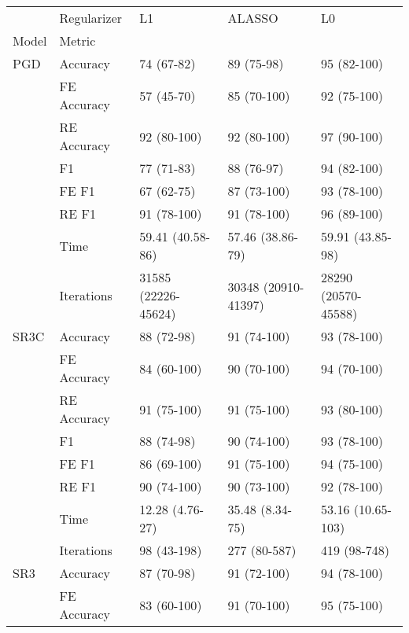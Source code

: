 \begin{tabular}{lllll}
\toprule
    & Regularizer &                   L1 &               ALASSO &                   L0 \\
Model & Metric &                      &                      &                      \\
\midrule
PGD & Accuracy &           74 (67-82) &           89 (75-98) &          95 (82-100) \\
    & FE Accuracy &           57 (45-70) &          85 (70-100) &          92 (75-100) \\
    & RE Accuracy &          92 (80-100) &          92 (80-100) &          97 (90-100) \\
    & F1 &           77 (71-83) &           88 (76-97) &          94 (82-100) \\
    & FE F1 &           67 (62-75) &          87 (73-100) &          93 (78-100) \\
    & RE F1 &          91 (78-100) &          91 (78-100) &          96 (89-100) \\
    & Time &     59.41 (40.58-86) &     57.46 (38.86-79) &     59.91 (43.85-98) \\
    & Iterations &  31585 (22226-45624) &  30348 (20910-41397) &  28290 (20570-45588) \\
SR3C & Accuracy &           88 (72-98) &          91 (74-100) &          93 (78-100) \\
    & FE Accuracy &          84 (60-100) &          90 (70-100) &          94 (70-100) \\
    & RE Accuracy &          91 (75-100) &          91 (75-100) &          93 (80-100) \\
    & F1 &           88 (74-98) &          90 (74-100) &          93 (78-100) \\
    & FE F1 &          86 (69-100) &          91 (75-100) &          94 (75-100) \\
    & RE F1 &          90 (74-100) &          90 (73-100) &          92 (78-100) \\
    & Time &      12.28 (4.76-27) &      35.48 (8.34-75) &    53.16 (10.65-103) \\
    & Iterations &          98 (43-198) &         277 (80-587) &         419 (98-748) \\
SR3 & Accuracy &           87 (70-98) &          91 (72-100) &          94 (78-100) \\
    & FE Accuracy &          83 (60-100) &          91 (70-100) &          95 (75-100) \\

\end{tabular}
